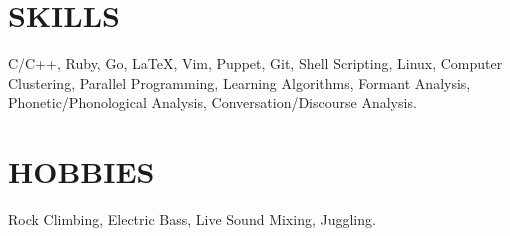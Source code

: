 \documentclass[overlapped]{res}
\begin{document}
\begin{resume}
\section{SKILLS} 
\vspace{7pt} 
C/C++, Ruby, Go, LaTeX, Vim, Puppet, Git, Shell Scripting, Linux, Computer Clustering, Parallel Programming, Learning Algorithms, Formant Analysis, Phonetic/Phonological Analysis, Conversation/Discourse Analysis.

\section{HOBBIES} 
\vspace{7pt} 
Rock Climbing, Electric Bass, Live Sound Mixing, Juggling.

\end{resume}
\end{document}
